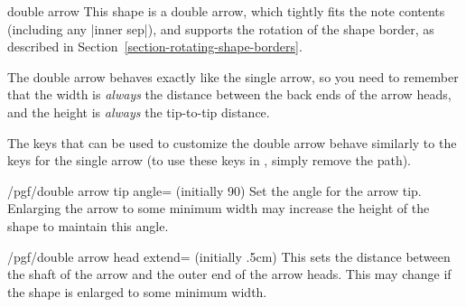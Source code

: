 \begin{shape}{double arrow}
  This shape is a double arrow, which tightly fits the note contents
	(including any |inner sep|), and supports the rotation of the shape
	 border, as described in Section~\ref{section-rotating-shape-borders}.
	
	
\begin{codeexample}[]
\end{codeexample}

  The double arrow behaves exactly like the single arrow, so you
  need to remember that the width is \emph{always} the distance
  between the back ends of the arrow heads, and the height
  is \emph{always} the tip-to-tip distance.

\begin{codeexample}[]
\end{codeexample}

  The \pgfname{} keys that can be used to customize the double arrow
  behave similarly to the keys for the single arrow (to
	use these keys in \tikzname{}, simply remove the 
	path).

\begin{key}{/pgf/double arrow tip angle= (initially 90)}
  Set the angle for the arrow tip. Enlarging the arrow to some
  minimum width may increase the height of the shape to maintain
  this angle.
\end{key}

\begin{key}{/pgf/double arrow head extend= (initially .5cm)}
  This sets the distance between the shaft of the arrow and the outer
  end of the arrow heads. This may change if the shape is enlarged to
  some minimum width.
\end{key}


\end{shape}

